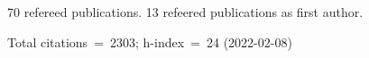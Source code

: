 70 refereed publications. 13 refeered publications as first author.

Total citations~=~2303; h-index~=~24 (2022-02-08)